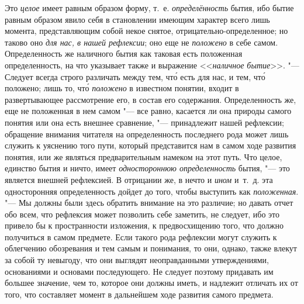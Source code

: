 \label{bkm:bm25a}
Это {\em целое} имеет равным образом форму, т.~е.
{\em определённость} бытия, ибо бытие равным образом
явило себя в становлении имеющим характер всего лишь момента,
представляющим собой некое снятое,
отрицательно-определенное; но таково оно
{\em для нас, в нашей рефлексии}; оно еще не
{\em положено} в себе самом. Определенность же
наличного бытия как таковая есть положенная определенность, на что
указывает также и выражение <<{\em наличное бытие}>>. "---
Следует всегда строго различать между тем, чт\'{о} есть для нас,
и тем, чт\'{о} положено; лишь то, чт\'{о} {\em положено} в известном
понятии, входит в развертывающее рассмотрение его, в состав его содержания.
Определенность же, еще не положенная в нем самом "--- все равно, касается ли
она природы самого понятия или она есть внешнее сравнение, "--- принадлежит
нашей рефлексии; обращение внимания читателя на определенность последнего
рода может лишь служить к уяснению того пути, который представится нам в
самом ходе развития понятия, или же являться предварительным намеком на
этот путь. Что целое, единство бытия и ничто, имеет
{\em одностороннюю определенность} бытия, "--- это
является внешней рефлексией. В отрицании же, в нечто и
{\em ином} и~т.~д. эта односторонняя определенность
дойдет до того, чтобы выступить как {\em положенная}. "---
Мы должны были здесь обратить внимание на это различие; но давать отчет обо
всем, что рефлексия может позволить себе заметить, не следует, ибо это
привело бы к пространности изложения, к предвосхищению того, что должно
получиться в самом предмете. Если такого рода рефлексии могут служить к
облегчению обозревания и тем самым и понимания, то они, однако, также
влекут за собой ту невыгоду, что они выглядят неоправданными утверждениями,
основаниями и основами последующего. Не следует поэтому придавать им
большее значение, чем то, которое они должны иметь, и надлежит отличать их
от того, что составляет момент в дальнейшем ходе развития самого предмета.

